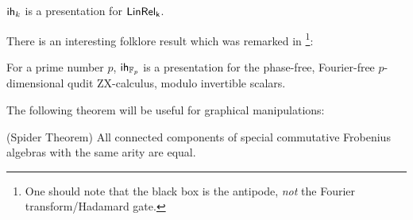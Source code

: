 \begin{theorem}\cite[Thm. 3.49]{ih}
${\sf ih}_k$ is a presentation for $\sf LinRel_k$.
\end{theorem}

There is an interesting folklore result which was remarked in \cite{distzx} \footnote{One should note that the black box is the antipode, {\em not} the Fourier transform/Hadamard gate.}:
\begin{lemma}
\label{lemma:phasefree}
For a prime number $p$, ${\sf ih}_{\mathbb{F}_p}$ is a presentation for the phase-free, Fourier-free $p$-dimensional qudit ZX-calculus, modulo invertible scalars.
\end{lemma}

The following theorem will be useful for graphical manipulations:
\begin{theorem}\cite{spider} (Spider Theorem)
All connected components of special commutative Frobenius algebras with the same arity are equal.
\end{theorem}


